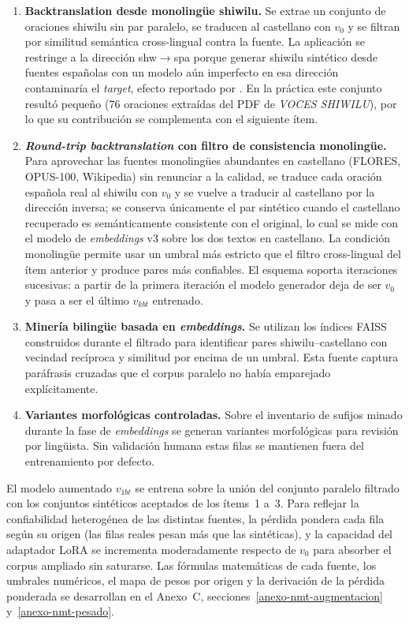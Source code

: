 \documentclass[12pt,a4paper,oneside]{book}
\begin{document}
\begin{enumerate}
  \item \textbf{Backtranslation desde monolingüe shiwilu.} Se extrae un conjunto de oraciones shiwilu sin par paralelo, se traducen al castellano con \(v_0\) y se filtran por similitud semántica cross-lingual contra la fuente. La aplicación se restringe a la dirección shw\(\rightarrow\)spa porque generar shiwilu sintético desde fuentes españolas con un modelo aún imperfecto en esa dirección contaminaría el \emph{target}, efecto reportado por \textcite{edunov2018bt}. En la práctica este conjunto resultó pequeño (76 oraciones extraídas del PDF de \emph{VOCES SHIWILU}), por lo que su contribución se complementa con el siguiente ítem.
  \item \textbf{\emph{Round-trip backtranslation} con filtro de consistencia monolingüe.} Para aprovechar las fuentes monolingües abundantes en castellano (FLORES, OPUS-100, Wikipedia) sin renunciar a la calidad, se traduce cada oración española real al shiwilu con \(v_0\) y se vuelve a traducir al castellano por la dirección inversa; se conserva únicamente el par sintético cuando el castellano recuperado es semánticamente consistente con el original, lo cual se mide con el modelo de \emph{embeddings} v3 sobre los dos textos en castellano. La condición monolingüe permite usar un umbral más estricto que el filtro cross-lingual del ítem anterior y produce pares más confiables. El esquema soporta iteraciones sucesivas: a partir de la primera iteración el modelo generador deja de ser \(v_0\) y pasa a ser el último \(v_{kbt}\) entrenado.
  \item \textbf{Minería bilingüe basada en \emph{embeddings}.} Se utilizan los índices FAISS construidos durante el filtrado para identificar pares shiwilu--castellano con vecindad recíproca y similitud por encima de un umbral. Esta fuente captura paráfrasis cruzadas que el corpus paralelo no había emparejado explícitamente.
  \item \textbf{Variantes morfológicas controladas.} Sobre el inventario de sufijos minado durante la fase de \emph{embeddings} se generan variantes morfológicas para revisión por lingüista. Sin validación humana estas filas se mantienen fuera del entrenamiento por defecto.
\end{enumerate}

El modelo aumentado \(v_{1bt}\) se entrena sobre la unión del conjunto paralelo filtrado con los conjuntos sintéticos aceptados de los ítems~1 a~3. Para reflejar la confiabilidad heterogénea de las distintas fuentes, la pérdida pondera cada fila según su origen (las filas reales pesan más que las sintéticas), y la capacidad del adaptador LoRA se incrementa moderadamente respecto de \(v_0\) para absorber el corpus ampliado sin saturarse. Las fórmulas matemáticas de cada fuente, los umbrales numéricos, el mapa de pesos por origen y la derivación de la pérdida ponderada se desarrollan en el Anexo~C, secciones~\ref{anexo-nmt-augmentacion} y~\ref{anexo-nmt-pesado}.
\end{document}
